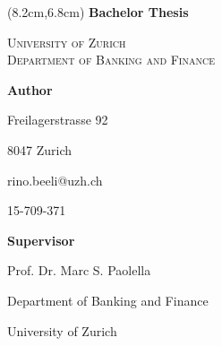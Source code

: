 
\begin{titlepage}
\begin{onehalfspacing}
\thispagestyle{empty}
\centering



\begin{textblock*}{4.8cm}(8.2cm,6.8cm)
\LARGE\textbf{Bachelor Thesis}
\end{textblock*}


{\Large\textsc{University of Zurich \\ Department of Banking and Finance}}


\vspace{4cm}


{\huge \textbf{ \myTitle }\par}


\vspace{3cm}


{\large \textbf{Author} \par}
\vspace{.2cm}
{\LARGE \myAuthor \par}
\vspace{.4cm}
{\large Freilagerstrasse 92 \par}
\vspace{.1cm}
{\large 8047 Zurich \par}
\vspace{.1cm}
{\large rino.beeli@uzh.ch \par}
\vspace{.1cm}
{\large 15-709-371 \par}


\vspace{1.6cm}


{\large \textbf{Supervisor} \par}
\vspace{.2cm}
{\Large Prof. Dr. Marc S. Paolella \par}
\vspace{.2cm}
{\large Department of Banking and Finance \par}
\vspace{.2cm}
{\large University of Zurich \par}


\vspace{2.5cm}

    
{\large \myDate \par}


\end{onehalfspacing}
\end{titlepage}


\clearpage
\newpage

\restoregeometry
\setcounter{page}{1}
